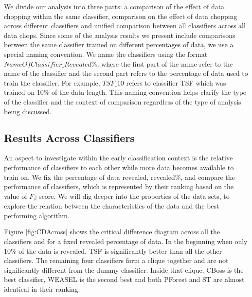 We divide our analysis into three parts: a comparison of the effect of data chopping within the same classifier,
comparison on the effect of data chopping across different classifiers and unified comparison between all classifiers
across all data chops.
Since some of the analysis results we present include comparisons between the same classifier trained on different percentages of data, we use a special naming convention.
We name the classifiers using the format $NameOfClassifier\_Revealed\%$, where the first part of the name refer to the name of the classifier
and the second part refers to the percentage of data used to train the classifier. For example, $TSF\_10$ refers to classifier TSF which was trained on 10\% of the data length.
This naming convention helps clarify the type of the classifier and the context of comparison regardless of the type of analysis being discussed.


\subsection{Results Across Classifiers}
\label{SubsectionAcrossComparison}
An aspect to investigate within the early classification context is the relative performance of classifiers to each other while more data becomes available to train on.
We fix the percentage of data revealed, revealed\%, and compare the performance of classifiers, which is represented by their ranking based on the value of $F_{\beta}$ score.
We will dig deeper into the properties of the data sets, to explore the relation between the characteristics of the data and the best performing algorithm.

Figure \ref{fig:CDAcross} shows the critical difference diagram across all the classifiers and for a fixed revealed percentage of data.
In the beginning when only 10\% of the data is revealed, TSF is significantly better than all the other classifiers.
The remaining four classifiers form a clique together and are not significantly different from the dummy classifier.
Inside that clique, CBoss is the best classifier, WEASEL is the second best and both PForest and ST are almost identical in their ranking.

